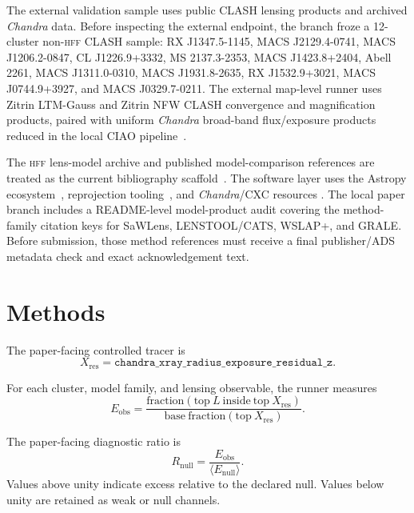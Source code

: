 \documentclass[11pt,a4paper]{article}
\newcommand{\HFF}{\textsc{hff}}
\newcommand{\Chandra}{\textit{Chandra}}
\newcommand{\Xres}{X_{\mathrm{res}}}
\begin{document}
The external validation sample uses public CLASH lensing products and archived
\Chandra{} data. Before inspecting the external endpoint, the branch froze a
12-cluster non-\HFF{} CLASH sample: RX J1347.5-1145, MACS J2129.4-0741, MACS
J1206.2-0847, CL J1226.9+3332, MS 2137.3-2353, MACS J1423.8+2404, Abell 2261,
MACS J1311.0-0310, MACS J1931.8-2635, RX J1532.9+3021, MACS J0744.9+3927, and
MACS J0329.7-0211. The external map-level runner uses Zitrin LTM-Gauss and
Zitrin NFW CLASH convergence and magnification products, paired with uniform
\Chandra{} broad-band flux/exposure products reduced in the local CIAO
pipeline~\citep{mast_clash_hlsp,zitrin2014_clash_lensing_models}.

The \HFF{} lens-model archive and published model-comparison references are
treated as the current bibliography scaffold~\citep{stsci_hff_lensmodels,
johnson2014_hff_lens_models,jauzac2014_hff_mass_magnification_maps,
meneghetti2017_frontier_fields_lens_modelling_comparison,
priewe2017_lens_models_under_microscope}. The software layer uses the
Astropy ecosystem~\citep{astropy2013,astropy2018,astropy2022},
reprojection tooling~\citep{reproject_package}, and \Chandra{}/CXC resources
\citep{ciao_cxc_citation}. The local paper branch includes a README-level
model-product audit covering the method-family citation keys for SaWLens,
LENSTOOL/CATS, WSLAP+, and GRALE. Before submission, those method references
must receive a final publisher/ADS metadata check and exact acknowledgement
text.

\section{Methods}

The paper-facing controlled tracer is
\begin{equation}
\Xres = \texttt{chandra\_xray\_radius\_exposure\_residual\_z}.
\end{equation}

For each cluster, model family, and lensing observable, the runner measures
\begin{equation}
E_{\mathrm{obs}}
 =
 \frac{
   \mathrm{fraction}(\mathrm{top}\ L\ \mathrm{inside}\ \mathrm{top}\ \Xres)
 }{
   \mathrm{base\ fraction}(\mathrm{top}\ \Xres)
 }.
\end{equation}

The paper-facing diagnostic ratio is
\begin{equation}
R_{\mathrm{null}} =
\frac{E_{\mathrm{obs}}}{\langle E_{\mathrm{null}}\rangle}.
\label{eq:nullratio}
\end{equation}
Values above unity indicate excess relative to the declared null. Values below
unity are retained as weak or null channels.
\end{document}
